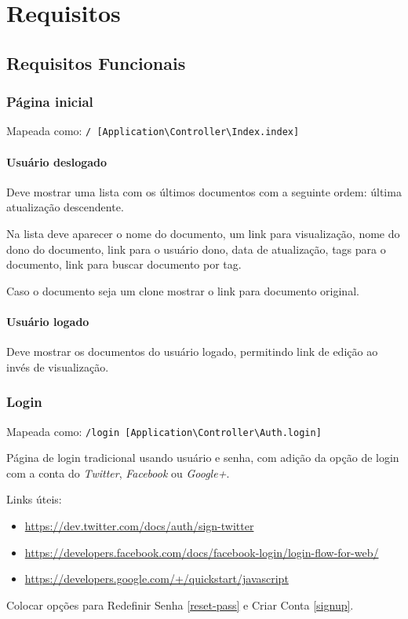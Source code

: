 \section{Requisitos}

\subsection{Requisitos Funcionais}

\subsubsection{Página inicial \label{home}}

Mapeada como:
\texttt{/ {[}Application\textbackslash{}Controller\textbackslash{}Index.index{]}}

\paragraph{Usuário deslogado}

Deve mostrar uma lista com os últimos documentos com a seguinte ordem:
última atualização descendente.

Na lista deve aparecer o nome do documento, um link para visualização,
nome do dono do documento, link para o usuário dono, data de
atualização, tags para o documento, link para buscar documento por tag.

Caso o documento seja um clone mostrar o link para documento original.

\paragraph{Usuário logado}

Deve mostrar os documentos do usuário logado, permitindo link de edição
ao invés de visualização.

\subsubsection{Login}

Mapeada como:
\texttt{/login {[}Application\textbackslash{}Controller\textbackslash{}Auth.login{]}}

Página de login tradicional usando usuário e senha, com adição da opção
de login com a conta do \emph{Twitter}, \emph{Facebook} ou
\emph{Google+}.

Links úteis:

\begin{itemize}
\item
  \url{https://dev.twitter.com/docs/auth/sign-twitter}
\item
  \url{https://developers.facebook.com/docs/facebook-login/login-flow-for-web/}
\item
  \url{https://developers.google.com/+/quickstart/javascript}
\end{itemize}
Colocar opções para Redefinir Senha \ref{reset-pass} e Criar Conta
\ref{signup}.


